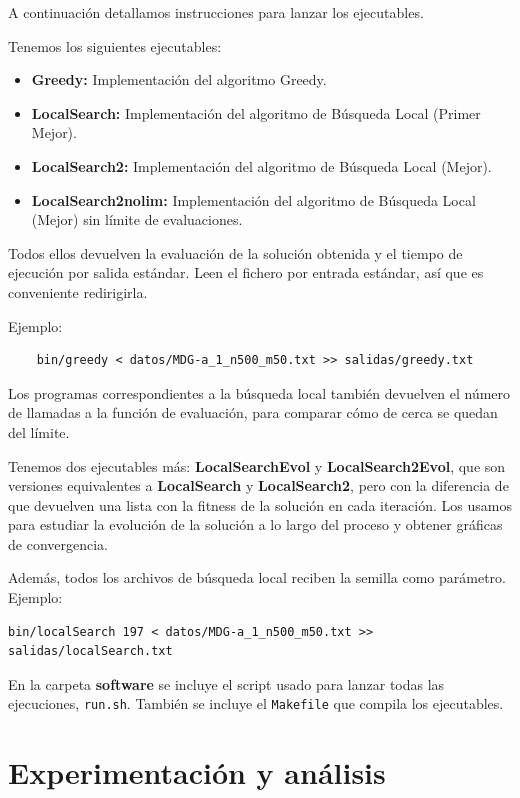 \documentclass{article}
\begin{document}
A continuación detallamos instrucciones para lanzar los ejecutables.

Tenemos los siguientes ejecutables:

\begin{itemize}
	\item \textbf{Greedy:} Implementación del algoritmo Greedy.
	\item \textbf{LocalSearch:} Implementación del algoritmo de Búsqueda Local (Primer Mejor).
	\item \textbf{LocalSearch2:} Implementación del algoritmo de Búsqueda Local (Mejor).
	\item \textbf{LocalSearch2nolim:} Implementación del algoritmo de Búsqueda Local (Mejor) sin límite de evaluaciones.
\end{itemize}

Todos ellos devuelven la evaluación de la solución obtenida y el tiempo de ejecución por salida estándar.
Leen el fichero por entrada estándar, así que es conveniente redirigirla.

Ejemplo:
\begin{verbatim}
	bin/greedy < datos/MDG-a_1_n500_m50.txt >> salidas/greedy.txt
\end{verbatim}

Los programas correspondientes a la búsqueda local también devuelven el número de llamadas a la función de evaluación, para
comparar cómo de cerca se quedan del límite.

Tenemos dos ejecutables más: \textbf{LocalSearchEvol} y \textbf{LocalSearch2Evol}, que son versiones equivalentes a
\textbf{LocalSearch} y \textbf{LocalSearch2}, pero con la diferencia de que devuelven una lista con la fitness de la solución
en cada iteración. Los usamos para estudiar la evolución de la solución a lo largo del proceso y obtener gráficas de convergencia.

Además, todos los archivos de búsqueda local reciben la semilla como parámetro. Ejemplo:
\begin{verbatim}
bin/localSearch 197 < datos/MDG-a_1_n500_m50.txt >> salidas/localSearch.txt
\end{verbatim}

En la carpeta \textbf{software} se incluye el script usado para lanzar todas las ejecuciones, \texttt{run.sh}. También se incluye
el \texttt{Makefile} que compila los ejecutables.

\pagebreak

\section{Experimentación y análisis}
\end{document}
